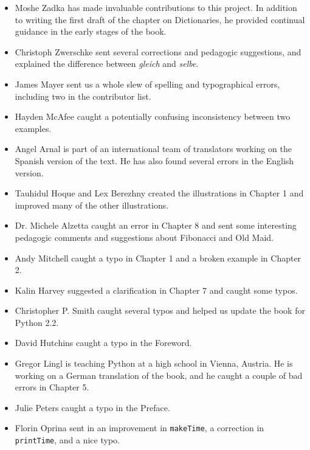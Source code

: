 \begin{itemize}
\item Moshe Zadka has made invaluable contributions to this project.
In addition to writing the first draft of the chapter on Dictionaries, he
provided continual guidance in the early stages of the book.

\item Christoph Zwerschke sent several corrections and
pedagogic suggestions, and explained the difference between {\em gleich}
and {\em selbe}.

\item James Mayer sent us a whole slew of spelling and
typographical errors, including two in the contributor list.

\item Hayden McAfee caught a potentially confusing inconsistency
between two examples.

\item Angel Arnal is part of an international team of translators
working on the Spanish version of the text.  He has also found several
errors in the English version.

\item Tauhidul Hoque and Lex Berezhny created the illustrations
in Chapter 1 and improved many of the other illustrations.

\item Dr. Michele Alzetta caught an error in Chapter 8 and sent
some interesting pedagogic comments and suggestions about Fibonacci
and Old Maid.

\item Andy Mitchell caught a typo in Chapter 1 and a broken example
in Chapter 2.

\item Kalin Harvey suggested a clarification in Chapter 7 and
caught some typos.

\item Christopher P. Smith caught several typos and helped us
update the book for Python 2.2.

\item David Hutchins caught a typo in the Foreword.

\item Gregor Lingl is teaching Python at a high school in Vienna,
Austria.  He is working on a German translation of the book,
and he caught a couple of bad errors in Chapter 5.

\item Julie Peters caught a typo in the Preface.

\item Florin Oprina sent in an improvement in \texttt{makeTime},
a correction in \texttt{printTime}, and a nice typo.


\end{itemize}
